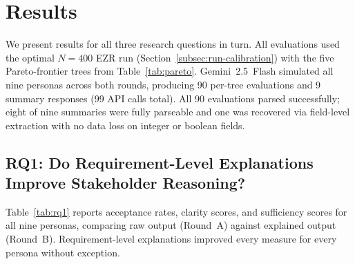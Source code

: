 \documentclass[sigconf,review]{acmart}
\begin{document}
\section{Results}
\label{sec:results}

We present results for all three research questions in turn. All
evaluations used the optimal $N=400$ EZR run
(Section~\ref{subsec:run-calibration}) with the five Pareto-frontier
trees from Table~\ref{tab:pareto}. Gemini~2.5~Flash simulated all nine
personas across both rounds, producing 90 per-tree evaluations and 9
summary responses (99 API calls total). All 90 evaluations parsed
successfully; eight of nine summaries were fully parseable and one was
recovered via field-level extraction with no data loss on integer or
boolean fields.

\subsection{RQ1: Do Requirement-Level Explanations Improve Stakeholder
Reasoning?}

Table~\ref{tab:rq1} reports acceptance rates, clarity scores, and
sufficiency scores for all nine personas, comparing raw output (Round~A)
against explained output (Round~B). Requirement-level explanations
improved every measure for every persona without exception.
\end{document}
